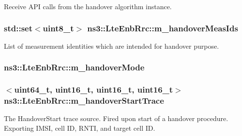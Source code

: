 Receive A\+PI calls from the handover algorithm instance. 

\subsubsection[{\texorpdfstring{m\+\_\+handover\+Meas\+Ids}{m_handoverMeasIds}}]{\setlength{\rightskip}{0pt plus 5cm}std\+::set$<$uint8\+\_\+t$>$ ns3\+::\+Lte\+Enb\+Rrc\+::m\+\_\+handover\+Meas\+Ids\hspace{0.3cm}{\ttfamily [private]}}\hypertarget{classns3_1_1LteEnbRrc_a6b2843eb1523e27a5682d68709d6306e}{}\label{classns3_1_1LteEnbRrc_a6b2843eb1523e27a5682d68709d6306e}


List of measurement identities which are intended for handover purpose. 

\subsubsection[{\texorpdfstring{m\+\_\+handover\+Mode}{m_handoverMode}}]{ ns3\+::\+Lte\+Enb\+Rrc\+::m\+\_\+handover\+Mode\hspace{0.3cm}{\ttfamily [private]}}\hypertarget{classns3_1_1LteEnbRrc_aa68424e6be8a396baf7fbad34e4dde06}{}\label{classns3_1_1LteEnbRrc_aa68424e6be8a396baf7fbad34e4dde06}
\subsubsection[{\texorpdfstring{m\+\_\+handover\+Start\+Trace}{m_handoverStartTrace}}]{$<$uint64\+\_\+t, uint16\+\_\+t, uint16\+\_\+t, uint16\+\_\+t$>$ ns3\+::\+Lte\+Enb\+Rrc\+::m\+\_\+handover\+Start\+Trace\hspace{0.3cm}{\ttfamily [private]}}\hypertarget{classns3_1_1LteEnbRrc_a1823b75aad2734d49d4ba83963bdd6fe}{}\label{classns3_1_1LteEnbRrc_a1823b75aad2734d49d4ba83963bdd6fe}
The {\ttfamily Handover\+Start} trace source. Fired upon start of a handover procedure. Exporting I\+M\+SI, cell ID, R\+N\+TI, and target cell ID. 
